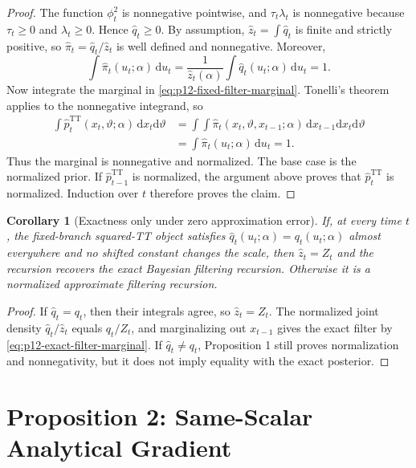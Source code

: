 \documentclass[11pt]{article}
\newcommand{\dd}{\mathrm{d}}
\newcommand{\TT}{\mathrm{TT}}
\newtheorem{corollary}{Corollary}
\theoremstyle{definition}
\theoremstyle{remark}
\begin{document}
\begin{proof}
The function \(\phi_t^2\) is nonnegative pointwise, and
\(\tau_t\lambda_t\) is nonnegative because \(\tau_t\ge0\) and
\(\lambda_t\ge0\).  Hence \(\widehat q_t\ge0\).  By assumption,
\(\widehat z_t=\int\widehat q_t\) is finite and strictly positive, so
\(\widehat\pi_t=\widehat q_t/\widehat z_t\) is well defined and nonnegative.
Moreover,
\[
  \int \widehat\pi_t(u_t;\alpha)\,\dd u_t
  =
  \frac{1}{\widehat z_t(\alpha)}
  \int \widehat q_t(u_t;\alpha)\,\dd u_t
  =
  1.
\]
Now integrate the marginal in \eqref{eq:p12-fixed-filter-marginal}.  Tonelli's
theorem applies to the nonnegative integrand, so
\[
\begin{aligned}
  \int \widehat p_t^{\TT}(x_t,\vartheta;\alpha)\,\dd x_t\dd\vartheta
  &=
  \int\int
  \widehat\pi_t(x_t,\vartheta,x_{t-1};\alpha)
  \,\dd x_{t-1}\dd x_t\dd\vartheta\\
  &=
  \int\widehat\pi_t(u_t;\alpha)\,\dd u_t
  =
  1.
\end{aligned}
\]
Thus the marginal is nonnegative and normalized.  The base case is the
normalized prior.  If \(\widehat p_{t-1}^{\TT}\) is normalized, the argument
above proves that \(\widehat p_t^{\TT}\) is normalized.  Induction over \(t\)
therefore proves the claim.
\end{proof}

\begin{corollary}[Exactness only under zero approximation error]
If, at every time \(t\), the fixed-branch squared-TT object satisfies
\(\widehat q_t(u_t;\alpha)=q_t(u_t;\alpha)\) almost everywhere and no shifted
constant changes the scale, then \(\widehat z_t=Z_t\) and the recursion
recovers the exact Bayesian filtering recursion.  Otherwise it is a normalized
approximate filtering recursion.
\end{corollary}

\begin{proof}
If \(\widehat q_t=q_t\), then their integrals agree, so
\(\widehat z_t=Z_t\).  The normalized joint density
\(\widehat q_t/\widehat z_t\) equals \(q_t/Z_t\), and marginalizing out
\(x_{t-1}\) gives the exact filter by \eqref{eq:p12-exact-filter-marginal}.
If \(\widehat q_t\ne q_t\), Proposition 1 still proves normalization and
nonnegativity, but it does not imply equality with the exact posterior.
\end{proof}

\section{Proposition 2: Same-Scalar Analytical Gradient}
\end{document}
